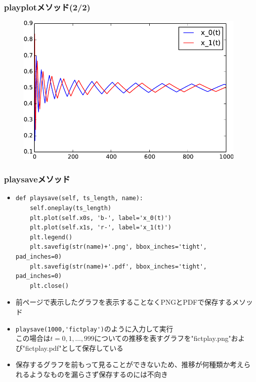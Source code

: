 \documentclass[dvipdfmx,fleqn,handout]{beamer}
\begin{document}
\begin{frame}
\frametitle{playplotメソッド(2/2)}
\begin{figure}
 \centering
 \includegraphics[width=\linewidth]{oneplay2.pdf}
 \label{fig:matchingpennies_plot}
\end{figure}
\end{frame}

\begin{frame}[fragile]%
\frametitle{playsaveメソッド}
\begin{itemize}\setlength{\parskip}{0.5em}
\item
\scriptsize
\begin{verbatim} 
def playsave(self, ts_length, name):
    self.oneplay(ts_length)
    plt.plot(self.x0s, 'b-', label='x_0(t)')
    plt.plot(self.x1s, 'r-', label='x_1(t)')
    plt.legend()
    plt.savefig(str(name)+'.png', bbox_inches='tight', pad_inches=0)
    plt.savefig(str(name)+'.pdf', bbox_inches='tight', pad_inches=0)
    plt.close()
\end{verbatim}
\normalsize
\pause
\item
前ページで表示したグラフを表示することなくPNGとPDFで保存するメソッド\pause
\item
\verb|playsave(1000,'fictplay')|のように入力して実行\pause\\
この場合は$t=0,1,\dots,999$についての推移を表すグラフを"fictplay.png"および"fictplay.pdf"として保存している\pause
\item
保存するグラフを前もって見ることができないため、推移が何種類か考えられるようなものを漏らさず保存するのには不向き\pause\\
\end{itemize}
\end{frame}
\end{document}
